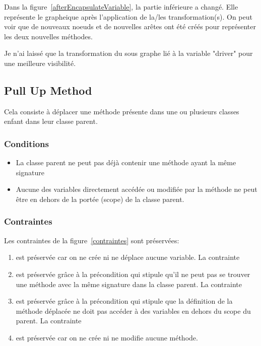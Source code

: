 \documentclass[a4paper, 12pt]{article}
\begin{document}
  Dans la figure~\ref{afterEncapsulateVariable}, la partie inférieure a changé.
  Elle représente le grapheique après l'application de la/les transformation(s). On peut voir que de nouveaux noeuds et de nouvelles arêtes ont été créés pour représenter les deux nouvelles méthodes.

  Je n'ai laissé que la transformation du sous graphe lié à la variable "driver" pour une meilleure visibilité.

  \subsection{Pull Up Method}

  Cela consiste à déplacer une méthode présente dans une ou plusieurs classes enfant dans leur classe parent.

  \subsubsection{Conditions}

  \begin{itemize}[label=\textbullet]
    \item La classe parent ne peut pas déjà contenir une méthode ayant la même signature
    \item Aucune des variables directement accédée ou modifiée par la méthode ne peut être en dehors de la portée (scope) de la classe parent.
  \end{itemize}

  \subsubsection{Contraintes}

  Les contraintes de la figure~\ref{contraintes} sont préservées:
  \begin{enumerate}
    La contrainte \item est préservée car on ne crée ni ne déplace aucune variable.
    La contrainte \item est préservée grâce à la précondition qui stipule qu'il ne peut pas se trouver une méthode avec la même signature dans la classe parent.
    La contrainte \item est préservée grâce à la précondition qui stipule que la définition de la méthode déplacée ne doit pas accéder à des variables en dehors du scope du parent.
    La contrainte \item est préservée car on ne crée ni ne modifie aucune méthode.
  \end{enumerate}
\end{document}

